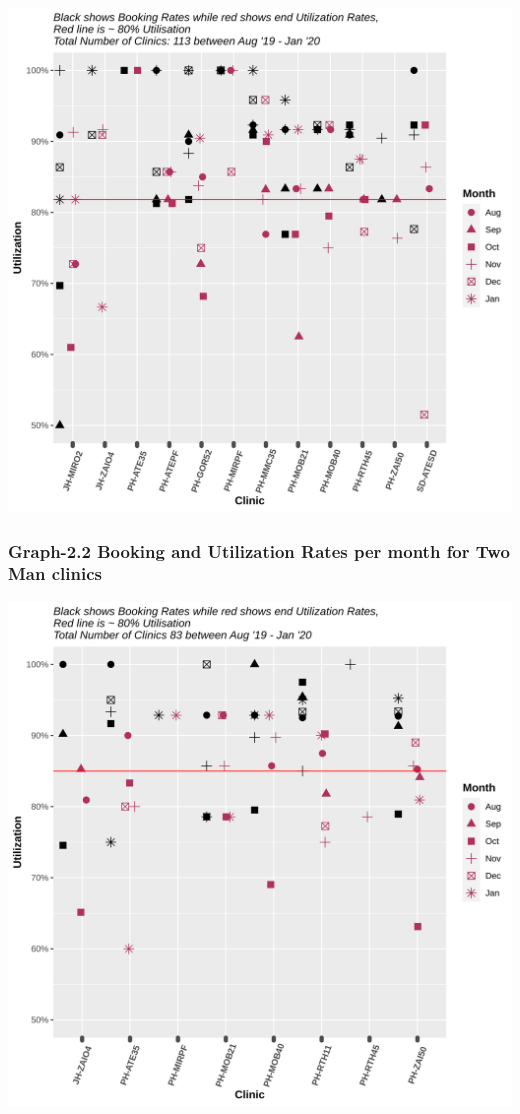 \documentclass[]{article}
\begin{document}
\begin{center}\includegraphics{LF2_files/figure-latex/unnamed-chunk-6-1} \end{center}

\hypertarget{graph-2.2-booking-and-utilization-rates-per-month-for-two-man-clinics}{%
\subsubsection{Graph-2.2 Booking and Utilization Rates per month for Two
Man
clinics}\label{graph-2.2-booking-and-utilization-rates-per-month-for-two-man-clinics}}

\begin{center}\includegraphics{LF2_files/figure-latex/unnamed-chunk-7-1} \end{center}
\end{document}
